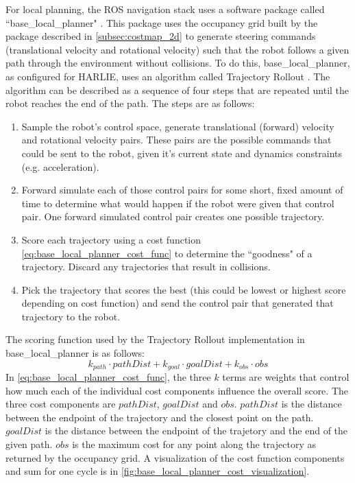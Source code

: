 For local planning, the ROS navigation stack uses a software package called ``base\_local\_planner" \autocite{BaseLocalPlannerWiki}. This package uses the occupancy grid built by the package described in \autoref{subsec:costmap_2d} to generate steering commands (translational velocity and rotational velocity) such that the robot follows a given path through the environment without collisions. To do this, base\_local\_planner, as configured for HARLIE, uses an algorithm called Trajectory Rollout \autocite{Gerkey_Konolige_2008}. The algorithm can be described as a sequence of four steps that are repeated until the robot reaches the end of the path. The steps are as follows:
\begin{enumerate}
\item Sample the robot's control space, generate translational (forward) velocity and rotational velocity pairs. These pairs are the possible commands that could be sent to the robot, given it's current state and dynamics constraints (e.g. acceleration).
\item Forward simulate each of those control pairs for some short, fixed amount of time to determine what would happen if the robot were given that control pair. One forward simulated control pair creates one possible trajectory.
\item Score each trajectory using a cost function \eqref{eq:base_local_planner_cost_func} to determine the ``goodness" of a trajectory. Discard any trajectories that result in collisions.
\item Pick the trajectory that scores the best (this could be lowest or highest score depending on cost function) and send the control pair that generated that trajectory to the robot.
\end{enumerate}

The scoring function used by the Trajectory Rollout implementation in base\_local\_planner is as follows:
\begin{equation}
	k_{path} \cdot pathDist + k_{goal} \cdot goalDist + k_{obs} \cdot obs \label{eq:base_local_planner_cost_func}
\end{equation}
In \eqref{eq:base_local_planner_cost_func}, the three $k$ terms are weights that control how much each of the individual cost components influence the overall score. The three cost components are $pathDist$, $goalDist$ and $obs$. $pathDist$ is the distance between the endpoint of the trajectory and the closest point on the path. $goalDist$ is the distance between the endpoint of the trajetory and the end of the given path. $obs$ is the maximum cost for any point along the trajectory as returned by the occupancy grid. A visualization of the cost function components and sum for one cycle is in \autoref{fig:base_local_planner_cost_visualization}.

